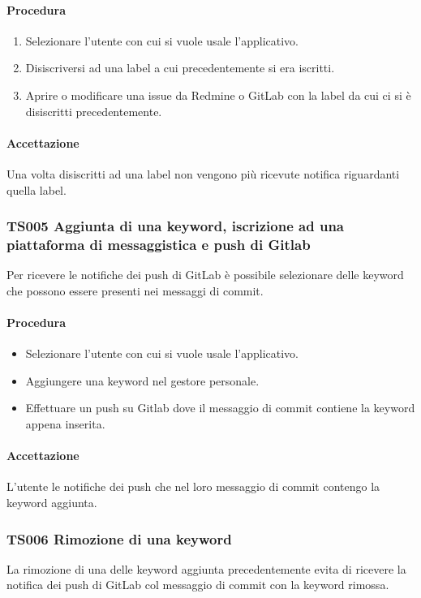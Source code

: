 		\paragraph*{Procedura}
			\begin{enumerate}
				\item Selezionare l'utente con cui si vuole usale l'applicativo.
				\item Disiscriversi ad una label a cui precedentemente si era iscritti.
				\item Aprire o modificare una issue da Redmine o GitLab con la label da cui ci si è disiscritti precedentemente.
			\end{enumerate}
		
		\paragraph*{Accettazione}
		Una volta disiscritti ad una label non vengono più ricevute notifica riguardanti quella label.
		
	\subsubsection{TS005 Aggiunta di una keyword, iscrizione ad una piattaforma di messaggistica e push di Gitlab}
		Per ricevere le notifiche dei push di GitLab è possibile selezionare delle keyword che possono essere presenti nei messaggi di commit.
		
		\paragraph*{Procedura}
		\begin{itemize}
			\item Selezionare l'utente con cui si vuole usale l'applicativo.
			\item Aggiungere una keyword nel gestore personale.
			\item Effettuare un push su Gitlab dove il messaggio di commit contiene la keyword appena inserita.
		\end{itemize}
	
		\paragraph*{Accettazione}
		L'utente le notifiche dei push che nel loro messaggio di commit contengo la keyword aggiunta.
	
	\subsubsection{TS006 Rimozione di una keyword}
		La rimozione di una delle keyword aggiunta precedentemente evita di ricevere la notifica dei push di GitLab col messaggio di commit con la keyword rimossa.
		
